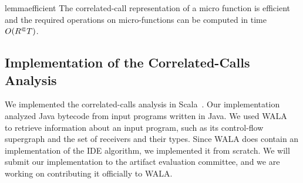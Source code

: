\begin{restatable}{lemma}{efficient}\label{lem:efficient}
  The correlated-call representation of a micro function is efficient and the required operations
  on micro-functions can be computed in time $O({R^\Subset} T)$.
\end{restatable}


\subsection{Implementation of the Correlated-Calls Analysis}
We implemented the correlated-calls analysis in Scala~\cite{odersky2004overview}. 
Our implementation analyzed Java bytecode from input programs written
in Java.
We used WALA~\cite{fink2012wala}
to retrieve information about an input program, such as its control-flow supergraph and the set of receivers and their types.
Since WALA does contain an implementation of the IDE algorithm,
we implemented it from scratch.
We will submit our implementation to the artifact evaluation committee, and we are working on contributing it officially to WALA. %

